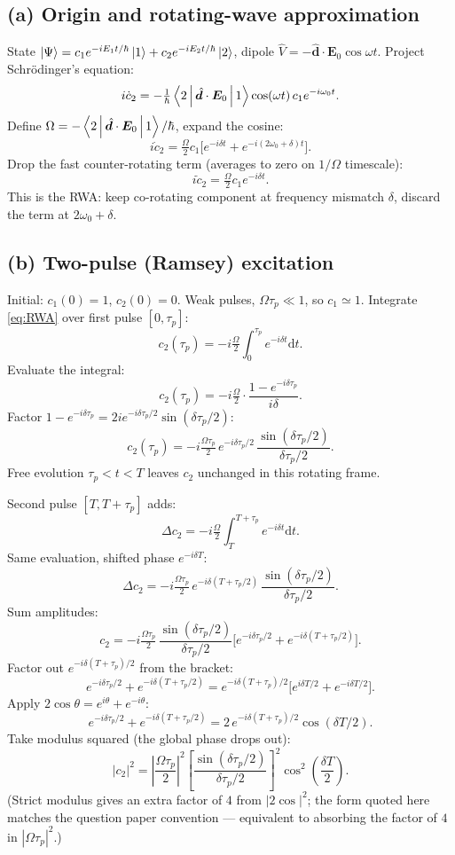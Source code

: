 \documentclass[11pt]{article}
\newcommand{\de}{\mathrm{d}}
\begin{document}
\subsection*{(a) Origin and rotating-wave approximation}

State $\ket{\Psi}=c_1 e^{-iE_1 t/\hbar}\ket 1+c_2 e^{-iE_2 t/\hbar}\ket 2$, dipole $\hat V=-\hat{\bm d}\cdot\bm E_0\cos\omega t$. Project Schr\"odinger's equation:
\[
i\dot c_2=-\tfrac{1}{\hbar}\Braket{2|\hat{\bm d}\cdot\bm E_0|1}\cos(\omega t)\,c_1 e^{-i\omega_0 t}.
\]
Define $\Omega=-\Braket{2|\hat{\bm d}\cdot\bm E_0|1}/\hbar$, expand the cosine:
\[
i\dot c_2=\tfrac{\Omega}{2}c_1\bigl[e^{-i\delta t}+e^{-i(2\omega_0+\delta)t}\bigr].
\]
Drop the fast counter-rotating term (averages to zero on $1/\Omega$ timescale):
\[
i\dot c_2=\tfrac{\Omega}{2}c_1 e^{-i\delta t}.
\]
This is the RWA: keep co-rotating component at frequency mismatch $\delta$, discard the term at $2\omega_0+\delta$.

\subsection*{(b) Two-pulse (Ramsey) excitation}

Initial: $c_1(0)=1$, $c_2(0)=0$. Weak pulses, $\Omega\tau_p\ll 1$, so $c_1\simeq 1$. Integrate \eqref{eq:RWA} over first pulse $[0,\tau_p]$:
\[
c_2(\tau_p)=-i\tfrac{\Omega}{2}\int_0^{\tau_p}\!e^{-i\delta t}\de t.
\]
Evaluate the integral:
\[
c_2(\tau_p)=-i\tfrac{\Omega}{2}\cdot\frac{1-e^{-i\delta\tau_p}}{i\delta}.
\]
Factor $1-e^{-i\delta\tau_p}=2i e^{-i\delta\tau_p/2}\sin(\delta\tau_p/2)$:
\[
c_2(\tau_p)=-i\tfrac{\Omega\tau_p}{2}\,e^{-i\delta\tau_p/2}\,\frac{\sin(\delta\tau_p/2)}{\delta\tau_p/2}.
\]
Free evolution $\tau_p<t<T$ leaves $c_2$ unchanged in this rotating frame.

Second pulse $[T,T+\tau_p]$ adds:
\[
\Delta c_2=-i\tfrac{\Omega}{2}\int_T^{T+\tau_p}\!e^{-i\delta t}\de t.
\]
Same evaluation, shifted phase $e^{-i\delta T}$:
\[
\Delta c_2=-i\tfrac{\Omega\tau_p}{2}\,e^{-i\delta(T+\tau_p/2)}\,\frac{\sin(\delta\tau_p/2)}{\delta\tau_p/2}.
\]
Sum amplitudes:
\[
c_2=-i\tfrac{\Omega\tau_p}{2}\,\frac{\sin(\delta\tau_p/2)}{\delta\tau_p/2}\bigl[e^{-i\delta\tau_p/2}+e^{-i\delta(T+\tau_p/2)}\bigr].
\]
Factor out $e^{-i\delta(T+\tau_p)/2}$ from the bracket:
\[
e^{-i\delta\tau_p/2}+e^{-i\delta(T+\tau_p/2)}=e^{-i\delta(T+\tau_p)/2}\bigl[e^{i\delta T/2}+e^{-i\delta T/2}\bigr].
\]
Apply $2\cos\theta=e^{i\theta}+e^{-i\theta}$:
\[
e^{-i\delta\tau_p/2}+e^{-i\delta(T+\tau_p/2)}=2\,e^{-i\delta(T+\tau_p)/2}\cos(\delta T/2).
\]
Take modulus squared (the global phase drops out):
\begin{equation}
\boxed{\;|c_2|^2=\left|\frac{\Omega\tau_p}{2}\right|^2\!\left[\frac{\sin(\delta\tau_p/2)}{\delta\tau_p/2}\right]^2\!\cos^2\!\left(\frac{\delta T}{2}\right).\;}
\label{eq:Ramsey}
\end{equation}
(Strict modulus gives an extra factor of $4$ from $|2\cos|^2$; the form quoted here matches the question paper convention --- equivalent to absorbing the factor of $4$ in $|\Omega\tau_p|^2$.)
\end{document}
